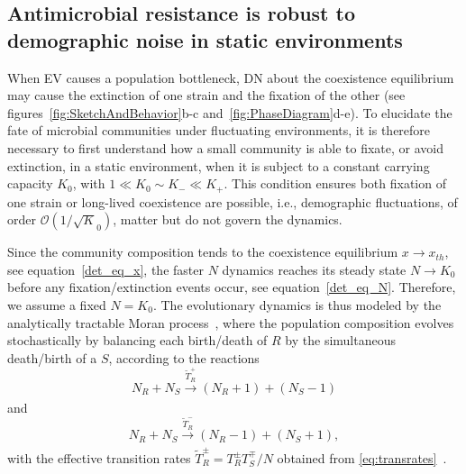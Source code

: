 \documentclass{article}
\begin{document}
\subsection{Antimicrobial resistance is robust to demographic noise in static environments}\label{Sec:Moran}

When EV causes a population bottleneck, DN about the coexistence equilibrium may cause the extinction of one strain and the fixation of the other (see figures~\ref{fig:SketchAndBehavior}b-c and~\ref{fig:PhaseDiagram}d-e). To elucidate the fate of microbial communities under fluctuating environments, it is therefore necessary to first understand how a small community is able to fixate, or avoid extinction, in  a static environment, when it is subject to a constant carrying capacity  \(K_0\), with \(1 \ll K_0\sim K_-\ll K_+\). This condition ensures both fixation of one strain or long-lived coexistence are possible, i.e., demographic fluctuations, of order \(\mathcal{O}(1/\sqrt K_0)\), matter but do not govern the dynamics.

Since the community composition tends to the coexistence equilibrium \(x\rightarrow x_{th}\), see equation~\eqref{det_eq_x}, the faster \(N\) dynamics reaches its steady state \(N\to K_0\) before any fixation/extinction events occur, see equation~\eqref{det_eq_N}. Therefore, we assume a fixed \(N=K_0\). The evolutionary dynamics is thus modeled by the analytically tractable Moran process~\cite{Moran,Ewens,Blythe07,Cremer11,wienand2017evolution,wienand2018eco}, where the population composition evolves stochastically by balancing each birth/death of $R$ by the simultaneous death/birth of a $S$, according to the reactions \[N_R+N_S\xrightarrow[]{\widetilde{T}^+_R}(N_R+1)+(N_S-1)\] and \[N_R+N_S\xrightarrow[]{\widetilde{T}^-_R}(N_R-1)+(N_S+1),\] with the effective transition rates $\widetilde{T}^\pm_R=T^\pm_RT^\mp_S/N$ obtained from \eqref{eq:transrates}~\cite{wienand2017evolution,wienand2018eco}.
\end{document}
